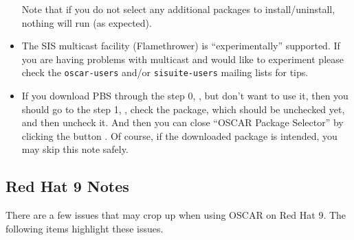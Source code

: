 \begin{itemize}
  Note that if you do not select any additional packages to
  install/uninstall, nothing will run (as expected).

\item The SIS multicast facility (Flamethrower) is ``experimentally'' 
  supported.  If you are having problems with multicast and would like 
  to experiment please check the {\tt oscar-users} and/or 
  {\tt sisuite-users} mailing lists for tips.

\item If you download PBS through the step 0, , but don't want to use it, then you should go to the
  step 1, , check the
  package, which should be unchecked yet, and then uncheck it.
  And then you can close ``OSCAR Package Selector'' 
  by clicking the button .
  Of course, if the downloaded package is intended, you may skip
  this note safely.

\endchange

\end{itemize}


\subsection{Red Hat 9 Notes}
\label{subsec:rh90notes}

There are a few issues that may crop up when using OSCAR on Red Hat 9.
The following items highlight these issues.

